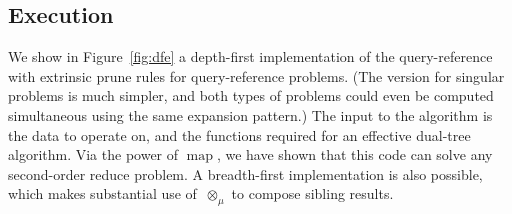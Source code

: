 \documentclass[times, leqno,twocolumn]{article}
\DeclareMathOperator*{\map}{map}
\newcommand{\fig}[1]{Figure~\ref{fig:#1}}
\newcommand{\nameop}[2]{{\scriptstyle\:}#1_{\!#2}}
\newcommand{\myop}[1]{\nameop{\otimes}{#1}}
\newcommand{\lettermu}{\mu}
\newcommand{\opmu}{\myop{\lettermu}}
\begin{document}
\subsection{Execution}

We show in \fig{dfe} a depth-first implementation of the query-reference with extrinsic prune rules for query-reference problems.
(The version for singular problems is much simpler, and both types of problems could even be computed simultaneous using the same expansion pattern.)
The input to the algorithm is the data to operate on, and the functions required for an effective dual-tree algorithm.
Via the power of $\map$, we have shown that this code can solve any second-order reduce problem.
A breadth-first implementation is also possible, which makes substantial use of $\opmu$ to compose sibling results.
\end{document}
